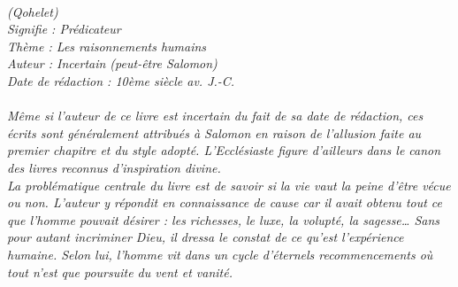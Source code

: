 \BFont
\noindent\hrulefill
{\footnotesize
\textit{
\bigskip
{\centering{}
\\(Qohelet)
\\Signifie : Prédicateur
\\Thème : Les raisonnements humains
\\Auteur : Incertain (peut-être Salomon)
\\Date de rédaction : 10ème siècle av. J.-C.\\}
}
\textit{
\\Même si  l’auteur de ce livre est incertain du fait de sa date de rédaction, ces écrits sont généralement attribués à Salomon en raison de l’allusion faite au premier chapitre et du style adopté. L’Ecclésiaste figure d’ailleurs dans le canon des livres reconnus d’inspiration divine.
\\La problématique centrale du livre est de savoir si la vie vaut la peine d’être vécue ou non. L’auteur y répondit en connaissance de cause car il avait obtenu tout ce que l’homme pouvait désirer : les richesses, le luxe, la volupté, la sagesse… Sans pour autant incriminer Dieu, il dressa le constat de ce qu’est l’expérience humaine. Selon lui, l’homme vit dans un cycle d’éternels recommencements où tout n’est que poursuite du vent et vanité. 
}
}
\par\nobreak\noindent\hrulefill
